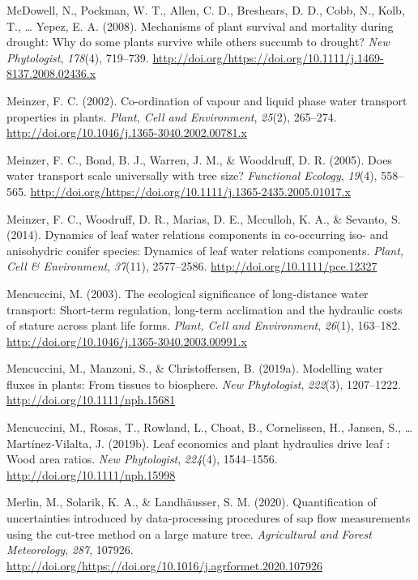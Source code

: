 \documentclass[11pt,twoside]{reedthesis}
\begin{document}
\hypertarget{ref-McDowell2008}{}
McDowell, N., Pockman, W. T., Allen, C. D., Breshears, D. D., Cobb, N.,
Kolb, T., \ldots{} Yepez, E. A. (2008). Mechanisms of plant survival and
mortality during drought: Why do some plants survive while others
succumb to drought? \emph{New Phytologist}, \emph{178}(4), 719--739.
\url{http://doi.org/https://doi.org/10.1111/j.1469-8137.2008.02436.x}

\hypertarget{ref-meinzer_co-ordination_2002}{}
Meinzer, F. C. (2002). Co-ordination of vapour and liquid phase water
transport properties in plants. \emph{Plant, Cell and Environment},
\emph{25}(2), 265--274.
\url{http://doi.org/10.1046/j.1365-3040.2002.00781.x}

\hypertarget{ref-Meinzer2005}{}
Meinzer, F. C., Bond, B. J., Warren, J. M., \& Wooddruff, D. R. (2005).
Does water transport scale universally with tree size? \emph{Functional
Ecology}, \emph{19}(4), 558--565.
\url{http://doi.org/https://doi.org/10.1111/j.1365-2435.2005.01017.x}

\hypertarget{ref-meinzer_dynamics_2014}{}
Meinzer, F. C., Woodruff, D. R., Marias, D. E., Mcculloh, K. A., \&
Sevanto, S. (2014). Dynamics of leaf water relations components in
co-occurring iso- and anisohydric conifer species: Dynamics of leaf
water relations components. \emph{Plant, Cell \& Environment},
\emph{37}(11), 2577--2586. \url{http://doi.org/10.1111/pce.12327}

\hypertarget{ref-mencuccini_ecological_2003}{}
Mencuccini, M. (2003). The ecological significance of long-distance
water transport: Short-term regulation, long-term acclimation and the
hydraulic costs of stature across plant life forms. \emph{Plant, Cell
and Environment}, \emph{26}(1), 163--182.
\url{http://doi.org/10.1046/j.1365-3040.2003.00991.x}

\hypertarget{ref-mencuccinimodelling2019}{}
Mencuccini, M., Manzoni, S., \& Christoffersen, B. (2019a). Modelling
water fluxes in plants: From tissues to biosphere. \emph{New
Phytologist}, \emph{222}(3), 1207--1222.
\url{http://doi.org/10.1111/nph.15681}

\hypertarget{ref-mencuccini_leaf_2019}{}
Mencuccini, M., Rosas, T., Rowland, L., Choat, B., Cornelissen, H.,
Jansen, S., \ldots{} Martínez‐Vilalta, J. (2019b). Leaf economics and
plant hydraulics drive leaf : Wood area ratios. \emph{New Phytologist},
\emph{224}(4), 1544--1556. \url{http://doi.org/10.1111/nph.15998}

\hypertarget{ref-Merlin2020}{}
Merlin, M., Solarik, K. A., \& Landhäusser, S. M. (2020). Quantification
of uncertainties introduced by data-processing procedures of sap flow
measurements using the cut-tree method on a large mature tree.
\emph{Agricultural and Forest Meteorology}, \emph{287}, 107926.
\url{http://doi.org/https://doi.org/10.1016/j.agrformet.2020.107926}
\end{document}
